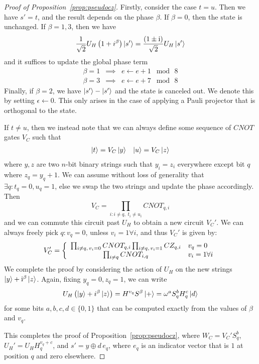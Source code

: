\begin{proof}[Proof of Proposition~\ref{prop:pseudocz}]
Firstly, consider the case $t=u$. Then we have $s'=t$, and the result depends on the phase $\beta$. If $\beta=0$, then the state is unchanged. If $\beta =1,3$, then we have
\[\frac{1}{\sqrt{2}}U_{H}\left(1+i^{\beta}\right)\ket{s'} = \frac{\left(1\pm \mathrm{i}\right)}{\sqrt{2}}U_{H}\ket{s'}\]
and it suffices to update the global phase term
\[
\begin{array}{rcl}
\beta = 1 & \implies & e\gets e+1\;\bmod\, 8\\
\beta=3 & \implies & e\gets e+7\;\bmod\,8
\end{array}\]
Finally, if $\beta=2$, we have $\ket{s'}-\ket{s'}$ and the state is canceled out. We denote this by setting $\epsilon\gets 0$. This only arises in the case of applying a Pauli projector that is orthogonal to the state.\par
If $t\neq u$, then we instead note that we can always define some sequence of $CNOT$ gates $V_{C}$ such that
\[
\begin{array}{lr}
\ket{t}=V_{C}\ket{y} & \ket{u} = V_{C}\ket{z}
\end{array}
\]
where $y,z$ are two $n$-bit binary strings such that $y_{i}=z_{i}$ everywhere except bit $q$ where $z_{q}=y_{q} + 1$. We can assume without loss of generality that $\exists q:t_{q}=0,u_{q}=1$, else we swap the two strings and update the phase accordingly. Then
\[V_{C} = \prod_{i: i\neq q,\;t_{i}\neq u_{i}}CNOT_{q,i}\]
and we can commute this circuit past $U_{H}$ to obtain a new circuit $V_{C}'$. We can always freely pick $q:v_{q}=0$, unless $v_{i}=1\forall i$, and thus $V_{C}'$ is given by:
\[V_{C}' = \left\{ \begin{array}{c l}
\prod_{i\neq q,\,v_{i}=0} CNOT_{q,i}\prod_{i\neq q,\,v_{i}=1}CZ_{q,i} & v_{q}=0 \\ 
\prod_{i\neq q} CNOT_{i,q} & v_{i}=1 \forall i \\
\end{array} \right.
\]
We complete the proof by considering the action of $U_{H}$ on the new strings $\ket{y}+\mathrm{i}^{\beta}\ket{z}$. Again, fixing $y_{q}=0,z_{q}=1$, we can write
\[
U_{H}\left(\ket{y}+i^{\beta}\ket{z}\right) = H^{v_{q}} S^{\beta}\ket{+} = \omega^{a}S_{q}^{b}H_{q}^{c}\ket{d}
\]
for some bits $a,b,c,d\in\{0,1\}$ that can be computed exactly from the values of $\beta$ and $v_{q}$.\par
This completes the proof of Proposition~\ref{prop:pseudocz}, where $W_{C}=V_{C}'S_{q}^{b}$, $U_{H}'=U_{H}H^{v_{q}+c}_{q}$, and $s'=y\oplus d\,e_{q}$, where $e_{q}$ is an indicator vector that is $1$ at position $q$ and zero elsewhere.
\end{proof}
